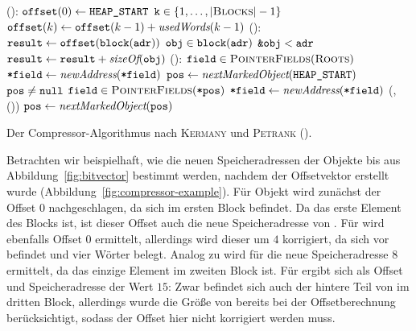 \begin{algorithm}[h]
\begin{algorithmic}[1]
	\State {}():
	\State \quad $\texttt{offset}(0) \gets \texttt{HEAP\_START}$
	\State \quad \FOR $\texttt{k} \in \{1, \dots, \left\lvert\textsc{Blocks}\right\rvert-1\}$
	\State \quad \quad $\texttt{offset}(k) \gets \texttt{offset}(k-1) + \textit{usedWords}(k-1)$
	\Statex
	\State {}():
	\State \quad $\texttt{result} \gets \texttt{offset}(\texttt{block}(\texttt{adr}))$	
	\State \quad \FOREACH $\texttt{obj} \in \texttt{block}(\texttt{adr})$
	\State \quad \quad \IF $\texttt{\&obj} < \texttt{adr}$	
	\State \quad \quad \quad $\texttt{result} \gets \texttt{result} + \textit{sizeOf}(\texttt{obj})$
	\State \quad \Return {}
	\Statex
	\State {}():
	\State \quad \FOREACH $\texttt{field} \in \textsc{PointerFields}(\textsc{Roots})$
	\State \quad \quad $\texttt{*field} \gets \textit{newAddress}(\texttt{*field})$
	\State \quad $\texttt{pos} \gets \textit{nextMarkedObject}(\texttt{HEAP\_START})$
	\State \quad \WHILE $\texttt{pos} \neq \texttt{null}$	
	\State \quad \quad \FOREACH $\texttt{field} \in \textsc{PointerFields}(\texttt{*pos})$
	\State \quad \quad \quad $\texttt{*field} \gets \textit{newAddress}(\texttt{*field})$
	\State \quad \quad {}(, ())
	\State \quad \quad $\texttt{pos} \gets \textit{nextMarkedObject}(\texttt{pos})$
\end{algorithmic}
\caption[Compressor-Algorithmus]{Der Compressor-Algorithmus nach \textsc{Kermany} und \textsc{Petrank} (\cite{kermany2006}).}
\label{algo:compressor}
\end{algorithm}

Betrachten wir beispielhaft, wie die neuen Speicheradressen der Objekte  bis  aus Abbildung~\ref{fig:bitvector} bestimmt werden, nachdem der Offsetvektor erstellt wurde (Abbildung~\ref{fig:compressor-example}).
Für Objekt  wird zunächst der Offset $0$ nachgeschlagen, da sich  im ersten Block befindet.
Da  das erste Element des Blocks ist, ist dieser Offset auch die neue Speicheradresse von .
Für  wird ebenfalls Offset $0$ ermittelt, allerdings wird dieser um $4$ korrigiert, da sich  vor  befindet und vier Wörter belegt.
Analog zu  wird für  die neue Speicheradresse $8$ ermittelt, da  das einzige Element im zweiten Block ist.
Für  ergibt sich als Offset und Speicheradresse der Wert $15$:
Zwar befindet sich auch der hintere Teil von  im dritten Block, allerdings wurde die Größe von  bereits bei der Offsetberechnung berücksichtigt, sodass der Offset hier nicht korrigiert werden muss.

